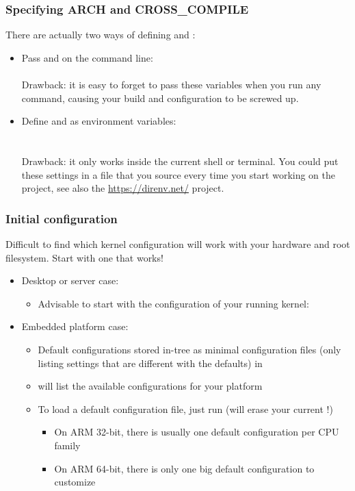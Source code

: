 \begin{frame}
  \frametitle{Specifying ARCH and CROSS\_COMPILE}
  There are actually two ways of defining  and :
  \begin{itemize}
  \item Pass  and  on the 
    command line: \\
     \\
    Drawback: it is easy to forget to pass these variables when
    you run any  command, causing your build and
    configuration to be screwed up.
  \item Define  and  as environment
    variables: \\
     \\
     \\
    Drawback: it only works inside the current shell or terminal. You
    could put these settings in a file that you source every time you
    start working on the project, see also the
    \url{https://direnv.net/} project.
  \end{itemize}
\end{frame}

\begin{frame}
  \frametitle{Initial configuration}
  Difficult to find which kernel configuration will work
  with your hardware and root filesystem. Start with one
  that works!
  \begin{itemize}
  \item Desktop or server case:
     \begin{itemize}
       \item Advisable to start with the configuration of your running
	  kernel:\\
     \end{itemize}
   \item Embedded platform case:
     \begin{itemize}
       \item Default configurations stored in-tree as minimal
         configuration files (only listing settings that are different
         with the defaults) in 
       \item {} will list the available configurations for
         your platform
       \item To load a default configuration file, just run
          (will erase your current
         !)
         \begin{itemize}
           \item On ARM 32-bit, there is usually one default
             configuration per CPU family
           \item On ARM 64-bit, there is only one big default
             configuration to customize
         \end{itemize}
     \end{itemize}
  \end{itemize}
\end{frame}

